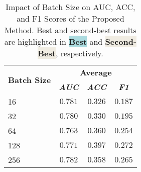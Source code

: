

\begin{table}[t]
    \caption{
        Impact of Batch Size on AUC, ACC, and F1 Scores of the Proposed Method.
        Best and second-best results are highlighted in \colorbox[HTML]{ACDBDF}{\textbf{Best}} and \colorbox[HTML]{f0ece2}{\textbf{Second-Best}}, respectively.
        }
    \renewcommand{\arraystretch}{1.2} 
    \begin{center}
        \begin{tabular}{l|ccc}
            \hline
        \multirow{2}{*}{\textbf{Batch Size}} &  \multicolumn{3}{c}{\textbf{Average}} \\
            \cline{2-4}
             & \textbf{\textit{AUC}} & \textbf{\textit{ACC}} & \textbf{\textit{F1}} \\
            \hline
            16 & \cellcolor{2nd} $0.781$ & $0.326$ & $0.187$ \\
            32 & $0.780$ & $0.330$ & $0.195$ \\
            64 & $0.763$ & \cellcolor{2nd} $0.360$ & $0.254$ \\
            128 & $0.771$ &\cellcolor{1st} $0.397$ & \cellcolor{1st} $0.272$ \\
            256 & \cellcolor{1st}   $0.782$ & $0.358$ & \cellcolor{2nd} $0.265$ \\
            \hline
        \end{tabular}
    \label{tab:batch_size_experiment}
    \end{center}
\end{table}

